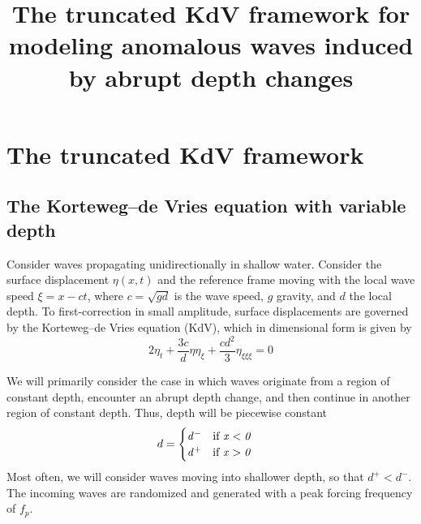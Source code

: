 \documentclass[11pt]{article}
\newcommand{\depth}{d}
\newcommand{\dup}{\depth^{-}}
\newcommand{\ddn}{\depth^{+}}
\newcommand{\freqp}{f_p}
\begin{document}
\title{The truncated KdV framework for modeling anomalous waves induced by abrupt depth changes}

\maketitle



\section{The truncated KdV framework}

\subsection{The Korteweg–de Vries equation with variable depth}
Consider waves propagating unidirectionally in shallow water. Consider the surface displacement $\eta(x,t)$ and the reference frame moving with the local wave speed $\xi = x - ct$, where $c = \sqrt{g \depth}$ is the wave speed, $g$ gravity, and $\depth$ the local depth.
To first-correction in small amplitude, surface displacements are governed by the Korteweg–de Vries equation (KdV), which in dimensional form is given by
\begin{equation}
2 \eta_t + \frac{3 c}{\depth} \eta \eta_{\xi} + \frac{c \depth^2}{3} \eta_{\xi \xi \xi} = 0
\end{equation}

We will primarily consider the case in which waves originate from a region of constant depth, encounter an abrupt depth change, and then continue in another region of constant depth. Thus, depth will be piecewise constant
\begin{align}
\depth = 
\begin{cases}
\it \dup \quad \mbox{if } x<0 \\
\it \ddn \quad \mbox{if } x>0
\end{cases}
\end{align}
Most often, we will consider waves moving into shallower depth, so that $\ddn < \dup$. The incoming waves are randomized and generated with a peak forcing frequency of $\freqp$. 
\end{document}
